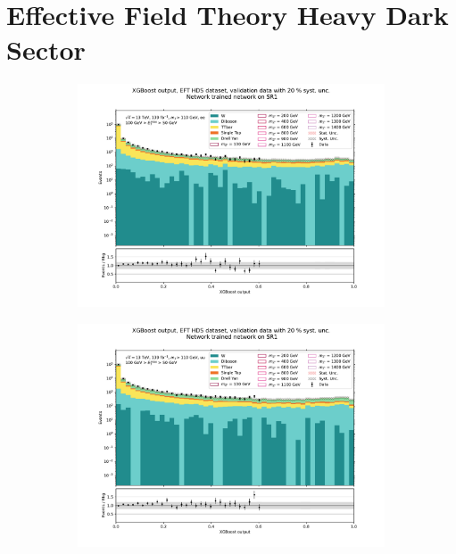 \documentclass[12pt, a4paper]{book}
\begin{document}
\section{Effective Field Theory Heavy Dark Sector}
\begin{figure}[!ht]
	\centering
	\begin{subfigure}[b]{0.49\textwidth}
      \centering
      \includegraphics[width=1\textwidth]{XGBoost/Model_independent/50-100/EFT_HDS/VAL_ee.pdf}
   \end{subfigure}
   \hfill
   \begin{subfigure}[b]{0.49\textwidth}
      \centering
      \includegraphics[width=1\textwidth]{XGBoost/Model_independent/50-100/EFT_HDS/VAL_uu.pdf}
   \end{subfigure}

\end{figure}
\end{document}

